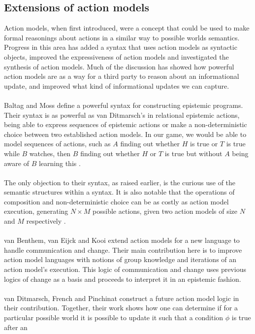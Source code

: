 \documentclass[12pt, a4paper, titlepage]{scrartcl}
\begin{document}
\subsection{Extensions of action models}
Action models, when first introduced, were a concept that could be used to make
formal reasonings about actions in a similar way to possible worlds semantics.
Progress in this area has added a syntax that uses action models as syntactic
objects, improved the expressiveness of action models and investigated the
synthesis of action models.
Much of the discussion has showed how powerful action models are as a way for a
third party to reason about an informational update, and improved what kind of
informational updates we can capture.\\
\\
Baltag and Moss define a powerful syntax for constructing epistemic programs.
Their syntax is as powerful as van Ditmarsch's in relational epistemic actions,
being able to express sequences of epistemic actions or make a non-deterministic
choice between two established action models.
In our game, we would be able to model sequences of actions, such as $A$ finding
out whether $H$ is true or $T$ is true while $B$ watches, then $B$ finding out
whether $H$ or $T$ is true but without $A$ being aware of $B$ learning this \cite{baltag2005programs}.\\
\\
The only objection to their syntax, as raised earlier, is the curious use of
the semantic structures within a syntax.
It is also notable that the operations of composition and non-deterministic
choice can be as costly as action model execution, generating $N \times M$
possible actions, given two action models of size $N$ and $M$
respectively \cite{baltag2005programs}.\\
\\
van Benthem, van Eijck and Kooi extend action models for a new language to
handle communication and change.
Their main contribution here is to improve action model languages with notions
of group knowledge and iterations of an action model's execution.
This logic of communication and change uses previous logics of change as a basis
and proceeds to interpret it in an epistemic fashion\cite{benthem2006lcc}.\\
\\
van Ditmarsch, French and Pinchinat construct a future action model logic in
their contribution.
Together, their work shows how one can determine if for a particular possible
world it is possible to update it such that a condition $\phi$ is true after an
\end{document}
